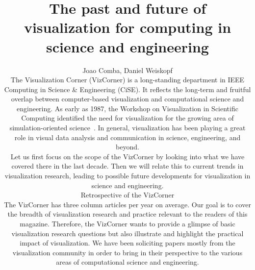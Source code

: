 \documentclass[10pt,journal,compsoc]{IEEEtran}
\begin{document}
\title{The past and future of visualization for computing in science and engineering}



\author{%
	Joao Comba, Daniel Weiskopf




\maketitle


The Visualization Corner (VizCorner) is a long-standing department in IEEE Computing in Science \& Engineering (CiSE). It reflects the long-term and fruitful overlap between computer-based visualization and computational science and engineering. As early as 1987, the Workshop on Visualization in Scientific Computing identified the need for visualization for the growing area of simulation-oriented science~\cite{NSFreport1987}. In general, visualization has been playing a great role in visual data analysis and communication in science, engineering, and beyond. 

Let us first focus on the scope of the VizCorner by looking into what we have covered there in the last decade. Then we will relate this to current trends in visualization research, leading to possible future developments for visualization in science and engineering.



\section{Retrospective of the VizCorner}

The VizCorner has three column articles per year on average. Our goal is to cover the breadth of visualization research and practice relevant to the readers of this magazine. Therefore, the VizCorner wants to provide a glimpse of basic visualization research questions but also illustrate and highlight the practical impact of visualization. We have been soliciting papers mostly from the visualization community in order to bring in their perspective to the various areas of computational science and engineering.

}
\end{document}
